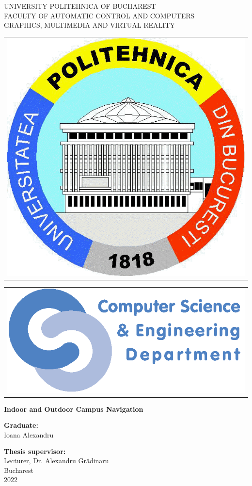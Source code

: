 
\thispagestyle{empty}
\begin{center}
\large
UNIVERSITY POLITEHNICA OF BUCHAREST \\
FACULTY OF AUTOMATIC CONTROL AND COMPUTERS \\
GRAPHICS, MULTIMEDIA AND VIRTUAL REALITY\\

\begin{tabular}[t]{@{}l}
	\includegraphics[scale=0.16]{figures/logos/upb.png}
\end{tabular}
\hfill
\begin{tabular}[t]{l@{}}
	\includegraphics[scale=0.3]{figures/logos/cse.png}
\end{tabular}
\vfill\noindent

{\LARGE
	\textbf{Indoor and Outdoor Campus Navigation}
}

\vspace{3cm}
\textbf{Graduate:}\\
Ioana Alexandru

\bigskip
\bigskip

\textbf{Thesis supervisor:}\\
Lecturer, Dr. Alexandru Grădinaru \\

Bucharest \\
2022 \\
\vspace*{1cm}
\end{center}
